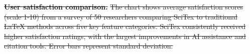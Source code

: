 \documentclass[preprint,review,12pt]{elsarticle}%
\providecommand{\DIFdeltex}[1]{{\protect\color{red}\sout{#1}}}                      %
\providecommand{\DIFdelFL}[1]{\DIFdel{#1}} %
\providecommand{\DIFdel}[1]{\texorpdfstring{\DIFdeltex{#1}}{}} %
\begin{document}
\begin{frontmatter}

{%
\textbf{\DIFdelFL{User satisfaction comparison.}} %
\DIFdelFL{The chart shows average satisfaction scores (scale 1-10) from a survey of 50 researchers comparing SciTex to traditional LaTeX methods across five key feature categories. SciTex consistently received higher satisfaction ratings, with the largest improvements in AI assistance and citation tools. Error bars represent standard deviation.}}



\end{frontmatter}
\end{document}
